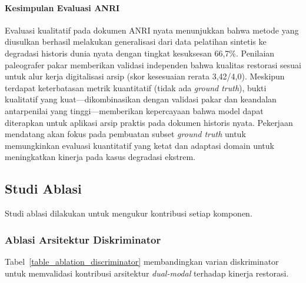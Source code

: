 \documentclass[journal]{IEEEtran}
\begin{document}
\paragraph{Kesimpulan Evaluasi ANRI}
Evaluasi kualitatif pada dokumen ANRI nyata menunjukkan bahwa metode yang diusulkan berhasil melakukan generalisasi dari data pelatihan sintetis ke degradasi historis dunia nyata dengan tingkat kesuksesan 66,7\%. Penilaian paleografer pakar memberikan validasi independen bahwa kualitas restorasi sesuai untuk alur kerja digitalisasi arsip (skor kesesuaian rerata 3,42/4,0). Meskipun terdapat keterbatasan metrik kuantitatif (tidak ada \textit{ground truth}), bukti kualitatif yang kuat---dikombinasikan dengan validasi pakar dan keandalan antarpenilai yang tinggi---memberikan kepercayaan bahwa model dapat diterapkan untuk aplikasi arsip praktis pada dokumen historis nyata. Pekerjaan mendatang akan fokus pada pembuatan subset \textit{ground truth} untuk memungkinkan evaluasi kuantitatif yang ketat dan adaptasi domain untuk meningkatkan kinerja pada kasus degradasi ekstrem.

\subsection{Studi Ablasi}

Studi ablasi dilakukan untuk mengukur kontribusi setiap komponen.

\subsubsection{Ablasi Arsitektur Diskriminator}

Tabel~\ref{table_ablation_discriminator} membandingkan varian diskriminator untuk memvalidasi kontribusi arsitektur \textit{dual-modal} terhadap kinerja restorasi.
\end{document}
